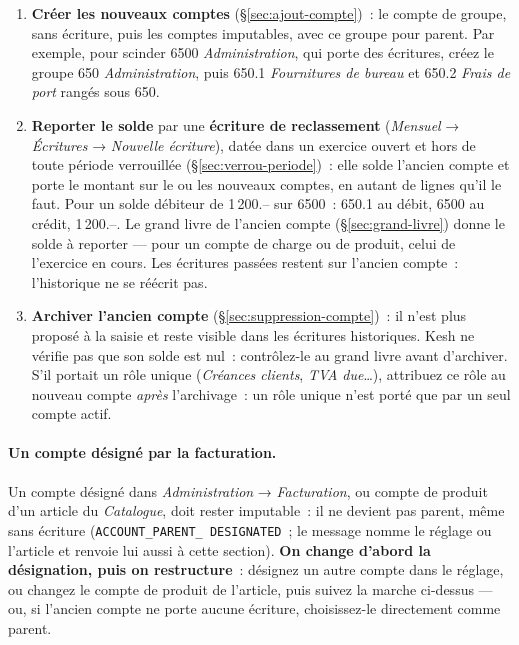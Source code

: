 \documentclass[a4paper,11pt,oneside]{article}
\begin{document}
\begin{enumerate}
    \item \textbf{Créer les nouveaux comptes} (\S\ref{sec:ajout-compte})~: le compte de groupe,
    sans écriture, puis les comptes imputables, avec ce groupe pour parent. Par exemple, pour
    scinder 6500 \emph{Administration}, qui porte des écritures, créez le groupe 650
    \emph{Administration}, puis 650.1 \emph{Fournitures de bureau} et 650.2 \emph{Frais de port}
    rangés sous 650.
    \item \textbf{Reporter le solde} par une \textbf{écriture de reclassement}
    (\emph{Mensuel} → \emph{Écritures} → \emph{Nouvelle écriture}), datée dans un exercice ouvert
    et hors de toute période verrouillée (\S\ref{sec:verrou-periode})~: elle solde l'ancien compte
    et porte le montant sur le ou les nouveaux comptes, en autant de lignes qu'il le faut. Pour
    un solde débiteur de 1\,200.-- sur 6500~: 650.1 au débit, 6500 au crédit, 1\,200.--. Le grand
    livre de l'ancien compte (\S\ref{sec:grand-livre}) donne le solde à reporter --- pour un
    compte de charge ou de produit, celui de l'exercice en cours. Les écritures passées restent
    sur l'ancien compte~: l'historique ne se réécrit pas.
    \item \textbf{Archiver l'ancien compte} (\S\ref{sec:suppression-compte})~: il n'est plus
    proposé à la saisie et reste visible dans les écritures historiques. Kesh ne vérifie pas
    que son solde est nul~: contrôlez-le au grand livre avant d'archiver. S'il portait un rôle
    unique (\emph{Créances clients}, \emph{TVA due}\ldots), attribuez ce rôle au nouveau compte
    \emph{après} l'archivage~: un rôle unique n'est porté que par un seul compte actif.
\end{enumerate}

\paragraph{Un compte désigné par la facturation.} Un compte désigné dans \emph{Administration} →
\emph{Facturation}, ou compte de produit d'un article du \emph{Catalogue}, doit rester imputable~:
il ne devient pas parent, même sans écriture (\texttt{ACCOUNT\_\allowbreak PARENT\_\allowbreak
DESIGNATED}~; le message nomme le réglage ou l'article et renvoie lui aussi à cette section).
\textbf{On change d'abord la désignation, puis on restructure}~: désignez un autre compte dans le
réglage, ou changez le compte de produit de l'article, puis suivez la marche ci-dessus --- ou,
si l'ancien compte ne porte aucune écriture, choisissez-le directement comme parent.
\end{document}
